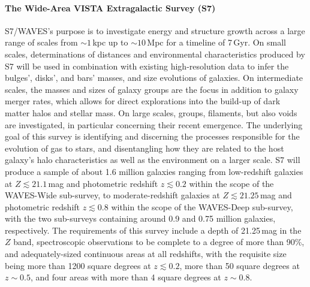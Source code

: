 \documentclass[a4paper,11pt]{article}
\begin{document}
\paragraph{The Wide-Area VISTA Extragalactic Survey (S7)}
S7/WAVES's \citep{4mosts7} purpose is to investigate energy and structure growth across a large range of scales from ${\sim}1$\,kpc up to ${\sim}10$\,Mpc for a timeline of 7\,Gyr. On small scales, determinations of distances and environmental characteristics produced by S7 will be used in combination with existing high-resolution data to infer the bulges', disks', and bars' masses, and size evolutions of galaxies. On intermediate scales, the masses and sizes of galaxy groups are the focus in addition to galaxy merger rates, which allows for direct explorations into the build-up of dark matter halos and stellar mass. On large scales, groups, filaments, but also voids are investigated, in particular concerning their recent emergence. The underlying goal of this survey is identifying and discerning the processes responsible for the evolution of gas to stars, and disentangling how they are related to the host galaxy's halo characteristics as well as the environment on a larger scale. S7 will produce a sample of about 1.6 million galaxies ranging from low-redshift galaxies at $Z\lesssim21.1$\,mag and photometric redshift $z\lesssim0.2$ within the scope of the WAVES-Wide sub-survey, to moderate-redshift galaxies at $Z\lesssim21.25$\,mag and photometric redshift $z\lesssim0.8$ within the scope of the WAVES-Deep sub-survey, with the two sub-surveys containing around 0.9 and 0.75 million galaxies, respectively. The requirements of this survey include a depth of 21.25\,mag in the $Z$ band, spectroscopic observations to be complete to a degree of more than 90\%, and adequately-sized continuous areas at all redshifts, with the requisite size being more than 1200 square degrees at $z\lesssim0.2$, more than 50 square degrees at $z\sim0.5$, and four areas with more than 4 square degrees at $z\sim0.8$.
%
\end{document}
